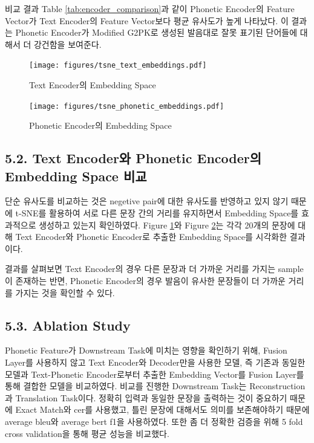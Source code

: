 \documentclass[letterpaper]{article} %
\begin{document}
비교 결과 Table \ref{tab:encoder_comparison}과 같이 Phonetic Encoder의 Feature Vector가 Text Encoder의 Feature Vector보다 평균 유사도가 높게 나타났다. 이 결과는 Phonetic Encoder가 Modified G2PK로 생성된 발음대로 잘못 표기된 단어들에 대해서 더 강건함을 보여준다.

\begin{figure}[ht]
    \centering
    \texttt{[image: figures/tsne\_text\_embeddings.pdf]}
    \caption{Text Encoder의 Embedding Space}
    \label{fig:tsne_text_encoder}
\end{figure}

\begin{figure}[ht]
    \centering
    \texttt{[image: figures/tsne\_phonetic\_embeddings.pdf]}
    \caption{Phonetic Encoder의 Embedding Space}
    \label{fig:tsne_phonetic_encoder}
\end{figure}

\subsection{5.2. Text Encoder와 Phonetic Encoder의 Embedding Space 비교}
단순 유사도를 비교하는 것은 negetive pair에 대한 유사도를 반영하고 있지 않기 때문에 t-SNE를 활용하여 서로 다른 문장 간의 거리를 유지하면서 Embedding Space를 효과적으로 생성하고 있는지 확인하였다.
Figure \ref{fig:tsne_text_encoder}와 Figure \ref{fig:tsne_phonetic_encoder}는 각각 20개의 문장에 대해 Text Encoder와 Phonetic Encoder로 추출한 Embedding Space를 시각화한 결과이다.

결과를 살펴보면 Text Encoder의 경우 다른 문장과 더 가까운 거리를 가지는 sample이 존재하는 반면, Phonetic Encoder의 경우 발음이 유사한 문장들이 더 가까운 거리를 가지는 것을 확인할 수 있다.

\subsection{5.3. Ablation Study}
Phonetic Feature가 Downstream Task에 미치는 영향을 확인하기 위해, Fusion Layer를 사용하지 않고 Text Encoder와 Decoder만을 사용한 모델, 즉 기존과 동일한 모델과 Text-Phonetic Encoder로부터 추출한 Embedding Vector를 Fusion Layer를 통해 결합한 모델을 비교하였다.
비교를 진행한 Downstream Task는 Reconstruction과 Translation Task이다.
정확히 입력과 동일한 문장을 출력하는 것이 중요하기 때문에 Exact Match와 cer를 사용했고, 틀린 문장에 대해서도 의미를 보존해야하기 때문에  average bleu와 average bert f1을 사용하였다.
또한 좀 더 정확한 검증을 위해 5 fold cross validation을 통해 평균 성능을 비교했다.
\end{document}
